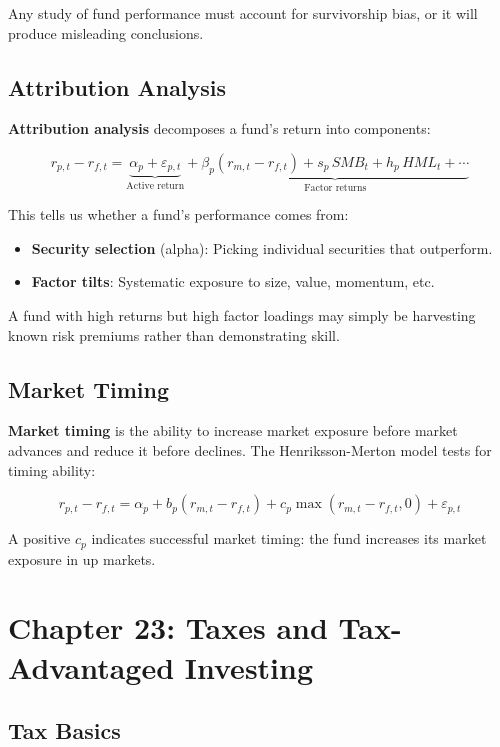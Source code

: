 \documentclass[11pt,letterpaper]{report}
\begin{document}
Any study of fund performance must account for survivorship bias, or it will produce misleading conclusions.

\section{Attribution Analysis}


\textbf{Attribution analysis} decomposes a fund's return into components:

$$r_{p,t} - r_{f,t} = \underbrace{\alpha_p + \varepsilon_{p,t}}_{\text{Active return}} + \underbrace{\beta_p(r_{m,t} - r_{f,t}) + s_p \, SMB_t + h_p \, HML_t + \cdots}_{\text{Factor returns}}$$

This tells us whether a fund's performance comes from:

\begin{itemize}
  \item \textbf{Security selection} (alpha): Picking individual securities that outperform.
  \item \textbf{Factor tilts}: Systematic exposure to size, value, momentum, etc.
\end{itemize}

A fund with high returns but high factor loadings may simply be harvesting known risk premiums rather than demonstrating skill.

\section{Market Timing}


\textbf{Market timing} is the ability to increase market exposure before market advances and reduce it before declines.  The Henriksson-Merton model tests for timing ability:

$$r_{p,t} - r_{f,t} = \alpha_p + b_p(r_{m,t} - r_{f,t}) + c_p \max(r_{m,t} - r_{f,t}, 0) + \varepsilon_{p,t}$$

A positive $c_p$ indicates successful market timing: the fund increases its market exposure in up markets.


\chapter{Chapter 23: Taxes and Tax-Advantaged Investing}


\section{Tax Basics}
\end{document}
